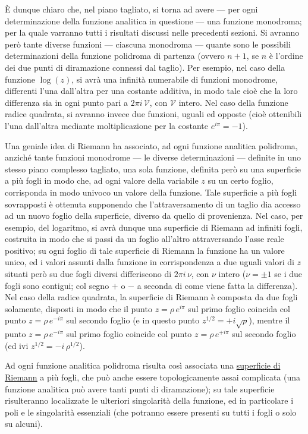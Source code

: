 \documentclass[11pt, a4paper]{book}
\numberwithin{equation}{section}
\begin{document}
È dunque chiaro che, nel piano tagliato, si torna ad avere — per ogni determinazione della funzione analitica in questione — una funzione monodroma; per la quale varranno tutti i risultati discussi nelle precedenti sezioni. Si avranno però tante diverse funzioni — ciascuna monodroma — quante sono le possibili determinazioni della funzione polidroma di partenza (ovvero $n+1$, se $n$ è l'ordine dei due punti di diramazione connessi dal taglio). Per esempio, nel caso della funzione $\log(z)$, si avrà una infinità numerabile di funzioni monodrome, differenti l'una dall'altra per una costante additiva, in modo tale cioè che la loro differenza sia in ogni punto pari a $2\pi i\,\mathcal{V}$, con $\mathcal{V}$ intero. Nel caso della funzione radice quadrata, si avranno invece due funzioni, uguali ed opposte (cioè ottenibili l'una dall'altra mediante moltiplicazione per la costante $e^{i\pi} = -1$).

Una geniale idea di Riemann ha associato, ad ogni funzione analitica polidroma, anziché tante funzioni monodrome — le diverse determinazioni — definite in uno stesso piano complesso tagliato, una sola funzione, definita però su una superficie a più fogli in modo che, ad ogni valore della variabile $z$ su un certo foglio, corrisponda in modo univoco un valore della funzione. Tale superficie a più fogli sovrapposti è ottenuta supponendo che l'attraversamento di un taglio dia accesso ad un nuovo foglio della superficie, diverso da quello di provenienza. Nel caso, per esempio, del logaritmo, si avrà dunque una superficie di Riemann ad infiniti fogli, costruita in modo%
che si passi da un foglio all'altro attraversando l'asse reale positivo; su ogni foglio di tale superficie di Riemann la funzione ha un valore unico, ed i valori assunti dalla funzione in corrispondenza a due uguali valori di $z$ situati però su due fogli diversi differiscono di $2\pi i\,\nu$, con $\nu$ intero ($\nu = \pm 1$ se i due fogli sono contigui; col segno $+$ o $-$ a seconda di come viene fatta la differenza). Nel caso della radice quadrata, la superficie di Riemann è composta da due fogli solamente, disposti in modo che il punto $z = \rho\,e^{i\pi}$ sul primo foglio coincida col punto $z = \rho\,e^{-i\pi}$ sul secondo foglio (e in questo punto $z^{1/2} = +i\sqrt{\rho}$), mentre il punto $z = \rho\,e^{-i\pi}$ sul primo foglio coincide col punto $z = \rho\,e^{+i\pi}$ sul secondo foglio (ed ivi $z^{1/2} = -i\,\rho^{1/2}$).

Ad ogni funzione analitica polidroma risulta così associata una \uline{superficie di Riemann} a più fogli, che può anche essere topologicamente assai complicata (una funzione analitica può avere tanti punti di diramazione); su tale superficie risulteranno localizzate le ulteriori singolarità della funzione, ed in particolare i poli e le singolarità essenziali (che potranno essere presenti su tutti i fogli o solo su alcuni).
\end{document}
